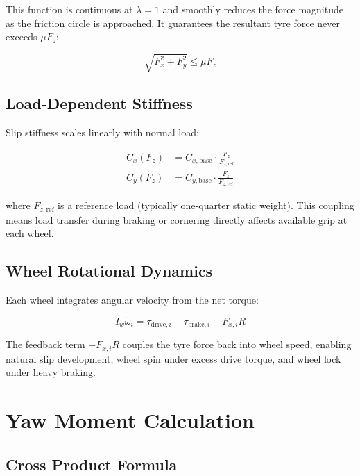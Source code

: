 \documentclass[11pt,a4paper]{article}
\begin{document}
This function is continuous at $\lambda=1$ and smoothly reduces the force magnitude as the friction circle is approached. It guarantees the resultant tyre force never exceeds $\mu F_z$:

\begin{equation}
\sqrt{F_x^2 + F_y^2} \leq \mu F_z
\end{equation}

\subsection{Load-Dependent Stiffness}

Slip stiffness scales linearly with normal load:

\begin{align}
C_x(F_z) &= C_{x,\text{base}} \cdot \frac{F_z}{F_{z,\text{ref}}} \\[4pt]
C_y(F_z) &= C_{y,\text{base}} \cdot \frac{F_z}{F_{z,\text{ref}}}
\end{align}

where $F_{z,\text{ref}}$ is a reference load (typically one-quarter static weight). This coupling means load transfer during braking or cornering directly affects available grip at each wheel.

\subsection{Wheel Rotational Dynamics}

Each wheel integrates angular velocity from the net torque:

\begin{equation}
I_w \dot{\omega}_i = \tau_{\text{drive},i} - \tau_{\text{brake},i} - F_{x,i} R
\label{eq:wheel_dynamics}
\end{equation}

The feedback term $-F_{x,i} R$ couples the tyre force back into wheel speed, enabling natural slip development, wheel spin under excess drive torque, and wheel lock under heavy braking.

\section{Yaw Moment Calculation}

\subsection{Cross Product Formula}
\end{document}
